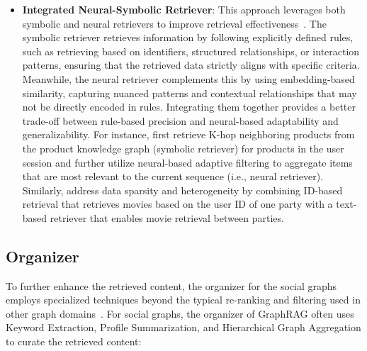\begin{itemize}[leftmargin=*]
    \item \textbf{Integrated Neural-Symbolic Retriever}: This approach leverages both symbolic and neural retrievers to improve retrieval effectiveness~\cite{wang2024knowledge2, zeng2024federated, wang2020global}. The symbolic retriever retrieves information by following explicitly defined rules, such as retrieving based on identifiers, structured relationships, or interaction patterns, ensuring that the retrieved data strictly aligns with specific criteria. Meanwhile, the neural retriever complements this by using embedding-based similarity, capturing nuanced patterns and contextual relationships that may not be directly encoded in rules. Integrating them together provides a better trade-off between rule-based precision and neural-based adaptability and generalizability. For instance, \citet{wang2020global, wang2024knowledge2, huang2021graph, qiu2020exploiting} first retrieve K-hop neighboring products from the product knowledge graph (symbolic retriever) for products in the user session and further utilize neural-based adaptive filtering to aggregate items that are most relevant to the current sequence (i.e., neural retriever). Similarly, \citet{zeng2024federated} address data sparsity and heterogeneity by combining ID-based retrieval that retrieves movies based on the user ID of one party with a text-based retriever that enables movie retrieval between parties.

\end{itemize}


\subsection{Organizer}
To further enhance the retrieved content, the organizer for the social graphs employs specialized techniques beyond the typical re-ranking and filtering used in other graph domains~\cite{zeng2024large, hou2024large, deldjoo2024review}. For social graphs, the organizer of GraphRAG often uses Keyword Extraction, Profile Summarization, and Hierarchical Graph Aggregation to curate the retrieved content:

